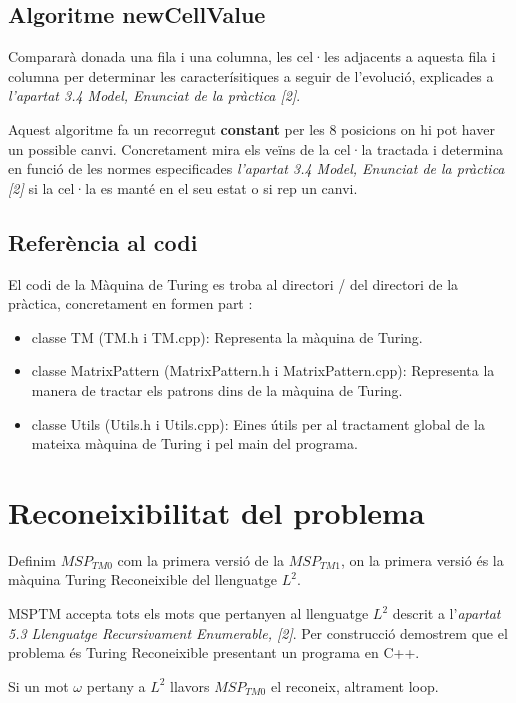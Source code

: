 \documentclass[12pt,a4paper]{report}
\def \w{$\omega$}
\def \tmz{$MSP_{TM0} $}
\def \tmu{$MSP_{TM1} $}
\def \ld{$L^{2}$}
\begin{document}
\subsection{Algoritme newCellValue}

Compararà donada una fila i una columna, les cel·les adjacents a aquesta fila i columna per determinar les caracterísitiques a seguir de l’evolució, explicades a \textit{l’apartat 3.4 Model, Enunciat de la pràctica [2]}.

Aquest algoritme fa un recorregut \textbf{constant} per les 8 posicions on hi pot haver un possible canvi. Concretament mira els veïns de la cel·la tractada i determina en funció de les normes especificades \textit{l’apartat 3.4 Model, Enunciat de la pràctica [2]} si la cel·la es manté en el seu estat o si rep un canvi.

\subsection{Referència al codi}

El codi de la Màquina de Turing es troba al directori / del directori de la pràctica, concretament en formen part :

\begin{itemize}
\item classe TM (TM.h i TM.cpp): Representa la màquina de Turing.
\item classe MatrixPattern (MatrixPattern.h i MatrixPattern.cpp): Representa la manera de tractar els patrons dins de la màquina de Turing.
\item classe Utils  (Utils.h i Utils.cpp): Eines útils per al tractament global de la mateixa màquina de Turing i pel main del programa.
\end{itemize}

\section{Reconeixibilitat del problema}

Definim \tmz{} com la primera versió de la \tmu{}, on la primera versió és la màquina Turing Reconeixible del llenguatge \ld{}.

MSPTM accepta tots els mots que pertanyen al llenguatge \ld{} descrit a l’\textit{apartat 5.3 Llenguatge Recursivament Enumerable, [2]}. Per construcció demostrem que el problema és Turing Reconeixible presentant un programa en C++.

Si un mot \w{} pertany a \ld{} llavors \tmz{} el reconeix, altrament loop.
\end{document}
